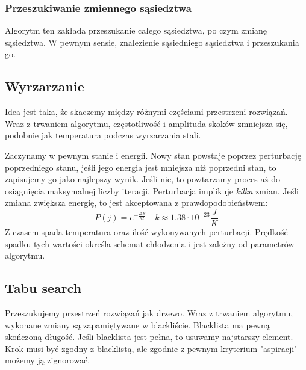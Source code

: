 \documentclass{../notatki}
\begin{document}
\subsubsection{Przeszukiwanie zmiennego sąsiedztwa}

Algorytm ten zakłada przeszukanie całego sąsiedztwa, po czym zmianę sąsiedztwa.
W pewnym sensie, znalezienie sąsiedniego sąsiedztwa i przeszukania go.

\subsection{Wyrzarzanie}

Idea jest taka, że skaczemy między różnymi częściami przestrzeni rozwiązań.
Wraz z trwaniem algorytmu, częstotliwość i amplituda skoków zmniejsza się,
podobnie jak temperatura podczas wyrzarzania stali.

Zaczynamy w pewnym stanie i energii. Nowy stan powstaje poprzez perturbację
poprzedniego stanu, jeśli jego energia jest mniejsza niż poprzedni stan, to
zapisujemy go jako najlepszy wynik. Jeśli nie, to powtarzamy proces
aż do osiągnięcia maksymalnej liczby
iteracji. Perturbacja implikuje \textit{kilka} zmian. Jeśli zmiana zwiększa
energię, to jest akceptowana z prawdopodobieństwem:
$$
P(j) = e^{-\frac{\Delta E}{kT}} \quad k \approx 1.38 \cdot 10^{-23} \frac{J}{K}
$$
Z czasem spada temperatura oraz ilość wykonywanych perturbacji. Prędkość
spadku tych wartości określa schemat chłodzenia i jest zależny od
parametrów algorytmu.

\subsection{Tabu search}

Przeszukujemy przestrzeń rozwiązań jak drzewo. Wraz z trwaniem algorytmu,
wykonane zmiany są zapamiętywane w blackliście. Blacklista ma pewną skończoną
długość. Jeśli blacklista jest pełna, to usuwamy najstarszy element.
Krok musi być zgodny z blacklistą, ale zgodnie z pewnym kryterium "aspiracji"
możemy ją zignorować.
\end{document}
